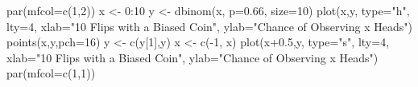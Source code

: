 \begin{Schunk}
\begin{Sinput}
 par(mfcol=c(1,2))
 x <- 0:10
 y <- dbinom(x, p=0.66, size=10)
 plot(x,y, type="h", lty=4, xlab="10 Flips with a Biased Coin", ylab="Chance of Observing x Heads")
 points(x,y,pch=16)
  y <- c(y[1],y)
 x <- c(-1, x)
 plot(x+0.5,y, type="s", lty=4, xlab="10 Flips with a Biased Coin", ylab="Chance of Observing x Heads")
 par(mfcol=c(1,1))
\end{Sinput}
\end{Schunk}
